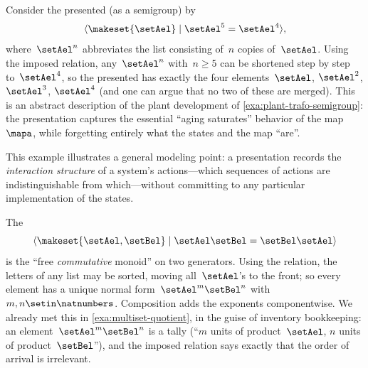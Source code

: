 \begin{example}
    \label{exa:presentation-plant}
    Consider the  presented (as a semigroup) by
    \begin{equation}
        \langle \makeset{\setAel} \mid \setAel^5 = \setAel^4 \rangle,
    \end{equation}
    where~$\setAel^n$ abbreviates the list consisting of~$n$ copies of~$\setAel$.
    Using the imposed relation, any~$\setAel^n$ with~$n \geq 5$ can be shortened step by step to~$\setAel^4$, so the presented  has exactly the four elements~$\setAel$, $\setAel^2$, $\setAel^3$, $\setAel^4$ (and one can argue that no two of these are merged).
    This is an abstract description of the plant development  of \cref{exa:plant-trafo-semigroup}: the presentation captures the essential ``aging saturates'' behavior of the map~$\mapa$, while forgetting entirely what the states and the map ``are''.

    This example illustrates a general modeling point: a presentation records the \emph{interaction structure} of a system's actions---which sequences of actions are indistinguishable from which---without committing to any particular implementation of the states.
\end{example}

\begin{example}
    \label{exa:presentation-commutative}
    The 
    \begin{equation}
        \langle \makeset{\setAel, \setBel} \mid \setAel\setBel = \setBel\setAel \rangle
    \end{equation}
    is the ``free \emph{commutative} monoid'' on two generators.
    Using the relation, the letters of any list may be sorted, moving all~$\setAel$'s to the front; so every element has a unique normal form~$\setAel^m \setBel^n$ with~$m, n \setin \natnumbers$.
    Composition adds the exponents componentwise.
    We already met this  in \cref{exa:multiset-quotient}, in the guise of inventory bookkeeping: an element~$\setAel^m \setBel^n$ is a tally (``$m$ units of product~$\setAel$, $n$ units of product~$\setBel$''), and the imposed relation says exactly that the order of arrival is irrelevant.
\end{example}

